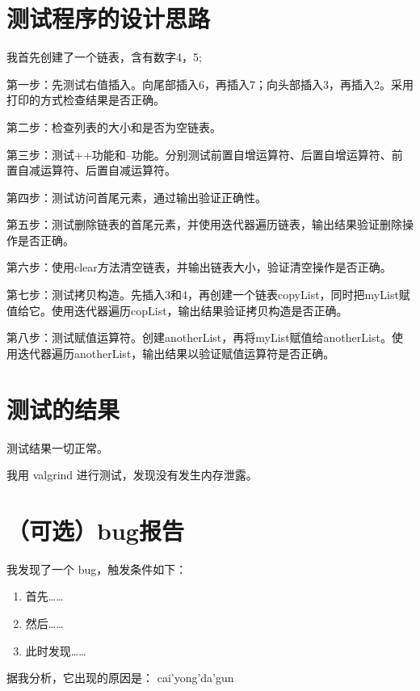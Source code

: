 \documentclass[UTF8]{ctexart}
\begin{document}
\pagestyle{fancy}
\fancyhead{}

\section{测试程序的设计思路}
我首先创建了一个链表，含有数字4，5;  

第一步：先测试右值插入。向尾部插入6，再插入7；向头部插入3，再插入2。采用打印的方式检查结果是否正确。  

第二步：检查列表的大小和是否为空链表。  

第三步：测试++功能和--功能。分别测试前置自增运算符、后置自增运算符、前置自减运算符、后置自减运算符。  

第四步：测试访问首尾元素，通过输出验证正确性。  

第五步：测试删除链表的首尾元素，并使用迭代器遍历链表，输出结果验证删除操作是否正确。  

第六步：使用clear方法清空链表，并输出链表大小，验证清空操作是否正确。  

第七步：测试拷贝构造。先插入3和4，再创建一个链表copyList，同时把myList赋值给它。使用迭代器遍历copList，输出结果验证拷贝构造是否正确。  

第八步：测试赋值运算符。创建anotherList，再将myList赋值给anotherList。使用迭代器遍历anotherList，输出结果以验证赋值运算符是否正确。 

\section{测试的结果}

测试结果一切正常。

我用 valgrind 进行测试，发现没有发生内存泄露。

\section{（可选）bug报告}

我发现了一个 bug，触发条件如下：

\begin{enumerate}
    \item 首先……
    \item 然后……
    \item 此时发现……
\end{enumerate}

据我分析，它出现的原因是：
cai'yong'da'gun
\end{document}
